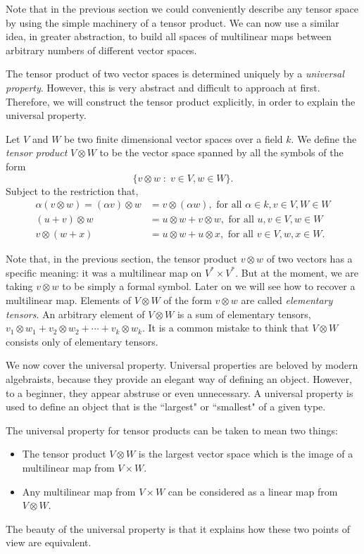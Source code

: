 Note that in the previous section we could conveniently describe any tensor
space by using the simple machinery of a tensor product. We can now
use a similar idea, in greater abstraction, to build all spaces of multilinear maps
between arbitrary numbers of different vector spaces. 

The tensor product of two vector spaces is determined uniquely by a \emph{universal 
property}. However, this is very abstract and difficult to approach at
first. Therefore, we will construct the tensor product explicitly,
in order to explain the universal property.
\begin{definition}
    Let $V$ and $W$ be two finite dimensional vector spaces over a
    field $k$. We define the \emph{tensor product} $V \otimes W$
    to be the vector space spanned by all the symbols of the form
    \begin{equation*}
        \{ v\otimes w\;:\; v \in V, w \in W\}.
    \end{equation*}
    Subject to the restriction that,
    \begin{align*}
        \alpha(v\otimes w) = (\alpha v)\otimes w &= v\otimes (\alpha w), \text{ for all }\alpha \in k, v \in V, W\in W\\
        (u+v)\otimes w &= u\otimes w+v\otimes w, \text{ for all }u,v \in V, w \in W\\
        v \otimes (w+x) &= u\otimes w + u\otimes x, \text{ for all }v \in V, w,x \in W.
    \end{align*}
\end{definition}
Note that, in the previous section, the tensor product $v\otimes w$
of two vectors has a specific meaning: it was a multilinear map on $V^*\times V^*$.
But at the moment, we are taking $v\otimes w$ to be simply a formal symbol. Later
on we will see how to recover a multilinear map. Elements of $V\otimes W$
of the form $v\otimes w$ are called \emph{elementary tensors}. An arbitrary element
of $V\otimes W$ is a sum of elementary tensors, $v_1\otimes w_1+v_2\otimes w_2 + \cdots + v_k\otimes w_k$.
It is a common mistake to think that $V\otimes W$ consists only of elementary tensors.

We now cover the universal property. Universal properties are beloved
by modern algebraists, because they provide an elegant way of defining an object.
However, to a beginner, they appear abstruse or even unnecessary. A universal
property is used to define an object that is the ``largest" or ``smallest"
of a given type. 

The universal property for tensor products can be taken to mean two things:
\begin{itemize}
    \item{} The tensor product $V\otimes W$ is the largest vector space
    which is the image of a multilinear map from $V\times W$.
    \item{} Any multilinear map from $V\times W$ can be considered
    as a linear map from $V\otimes W$.
\end{itemize}
The beauty of the universal property is that it explains how these two points
of view are equivalent. 

